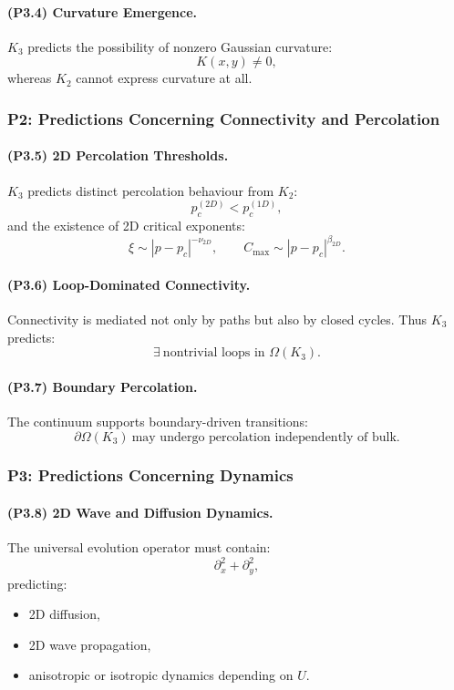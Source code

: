 \paragraph{(P3.4) Curvature Emergence.}
$K_3$ predicts the possibility of nonzero Gaussian curvature:
\[
K(x,y) \neq 0,
\]
whereas $K_2$ cannot express curvature at all.

\subsubsection{P2: Predictions Concerning Connectivity and Percolation}

\paragraph{(P3.5) 2D Percolation Thresholds.}
$K_3$ predicts distinct percolation behaviour from $K_2$:
\[
p_c^{(2D)} < p_c^{(1D)},
\]
and the existence of 2D critical exponents:
\[
\xi \sim |p - p_c|^{-\nu_{2D}},
\qquad
C_{\max} \sim |p - p_c|^{\beta_{2D}}.
\]

\paragraph{(P3.6) Loop-Dominated Connectivity.}
Connectivity is mediated not only by paths but also by closed cycles.  
Thus $K_3$ predicts:
\[
\exists \ \text{nontrivial loops in } \Omega(K_3).
\]

\paragraph{(P3.7) Boundary Percolation.}
The continuum supports boundary-driven transitions:
\[
\partial\Omega(K_3) \ \text{may undergo percolation independently of bulk}.
\]

\subsubsection{P3: Predictions Concerning Dynamics}

\paragraph{(P3.8) 2D Wave and Diffusion Dynamics.}
The universal evolution operator must contain:
\[
\partial_x^2 + \partial_y^2,
\]
predicting:
\begin{itemize}
    \item 2D diffusion,
    \item 2D wave propagation,
    \item anisotropic or isotropic dynamics depending on $U$.
\end{itemize}

